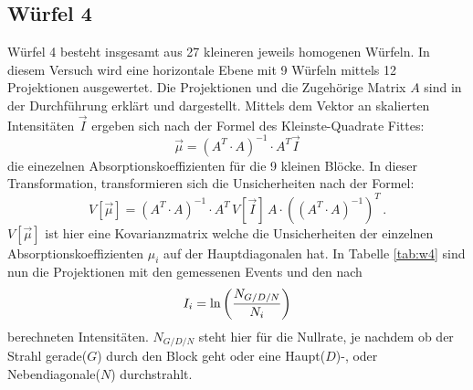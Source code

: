   \subsection{Würfel 4}
    Würfel 4 besteht insgesamt aus 27 kleineren jeweils homogenen Würfeln.
    In diesem Versuch wird eine horizontale Ebene mit 9 Würfeln mittels 12 Projektionen ausgewertet.
    Die Projektionen und die Zugehörige Matrix $A$ sind in der Durchführung erklärt und dargestellt.
    Mittels dem Vektor an skalierten Intensitäten $\vec{I}$ ergeben sich nach der Formel des Kleinste-Quadrate Fittes:
    \begin{equation}
      \vec{\mu} = \left( A^T \cdot A \right)^{-1} \cdot A^T \vec{I}
    \end{equation}
    die einezelnen Absorptionskoeffizienten für die 9 kleinen Blöcke.
    In dieser Transformation, transformieren sich die Unsicherheiten nach der Formel:
    \begin{equation}
      V[\vec{\mu}] = \left( A^T \cdot A \right)^{-1} \cdot A^T \, V[\vec{I}] \, A \cdot \left( \left( A^T \cdot A \right)^{-1} \right)^T \,.
    \end{equation}
    $V[\vec{\mu}]$ ist hier eine Kovarianzmatrix welche die Unsicherheiten der einzelnen Absorptionskoeffizienten $\mu_i$ auf der Hauptdiagonalen hat.
    In Tabelle  \ref{tab:w4} sind nun die Projektionen mit den gemessenen Events und den nach
    \begin{equation}
      I_i = \text{ln}\left( \frac{N_{G/D/N}}{N_i} \right)
    \end{equation}
    berechneten Intensitäten. $N_{G/D/N}$ steht hier für die Nullrate, je nachdem ob der Strahl gerade($G$) durch den Block geht oder eine Haupt($D$)-, oder Nebendiagonale($N$) durchstrahlt.
